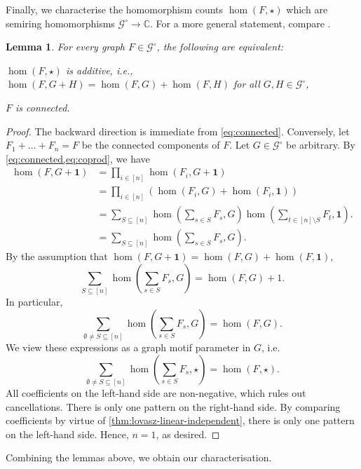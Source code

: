 \documentclass[11pt]{scrartcl}
\theoremstyle{definition}
\theoremstyle{plain}
\newtheorem{lemma}[definition]{Lemma}
\theoremstyle{remark}
\newcommand{\lG}{\mathcal{G}^\circ}
\begin{document}
	Finally, we characterise the homomorphism counts $\hom(F, \star)$ 
	which are semiring homomorphisms $\lG \to \mathbb{C}$.
	For a more general statement, compare \cite[Exercise~4.2]{lovasz_large_2012}.

	\begin{lemma}\label{lem:gmp-additive}
		For every graph $F \in \lG$, the following are equivalent:
		\begin{assertions}
			\item $\hom(F, \star)$ is \emph{additive}, i.e., $\hom(F, G + H) = \hom(F, G) + \hom(F, H)$ for all $G, H \in \lG$,
			\item $F$ is connected.
		\end{assertions}
	\end{lemma}
	\begin{proof}
		The backward direction is immediate from \cref{eq:connected}.
		Conversely, let $F_1 + \dots + F_n = F$ be the connected components of $F$.
		Let $G \in \lG$ be arbitrary.
		By \cref{eq:connected,eq:coprod}, we have
		\begin{align*}
		\hom(F, G + \boldsymbol{1}) 
		&= \prod_{i\in [n]} \hom(F_i, G+ \boldsymbol{1}) \\
		&= \prod_{i\in [n]} \left( \hom(F_i, G) + \hom(F_i, \boldsymbol{1}) \right)\\
		&= \sum_{S \subseteq [n]} \hom(\sum_{s \in S} F_s, G) \hom(\sum_{t \in [n] \setminus S} F_t, \boldsymbol{1}).
		\\
		&= \sum_{S \subseteq [n]} \hom(\sum_{s \in S} F_s, G).
		\end{align*}
		By the assumption that $\hom(F, G + \boldsymbol{1}) = \hom(F, G) + \hom(F,  \boldsymbol{1})$, 
		\[
			\sum_{S \subseteq [n]} \hom(\sum_{s \in S} F_s, G)
			= 
			\hom(F, G) + 1.
		\]
		In particular,
		\[
			\sum_{\emptyset \neq S \subseteq [n]} \hom(\sum_{s \in S} F_s, G)
			= 
			\hom(F, G).
		\]
		We view these expressions as a graph motif parameter in $G$, i.e.
		\[
			\sum_{\emptyset \neq S \subseteq [n]} \hom(\sum_{s \in S} F_s, \star)
			= 
			\hom(F, \star).
		\]
		All coefficients on the left-hand side are non-negative, which rules out cancellations.
		There is only one pattern on the right-hand side.
		By comparing coefficients by virtue of \cref{thm:lovasz-linear-independent}, 
		there is only one pattern on the left-hand side.
		Hence, $n = 1$, as desired.
	\end{proof}

	Combining the lemmas above, we obtain our characterisation.
\end{document}
